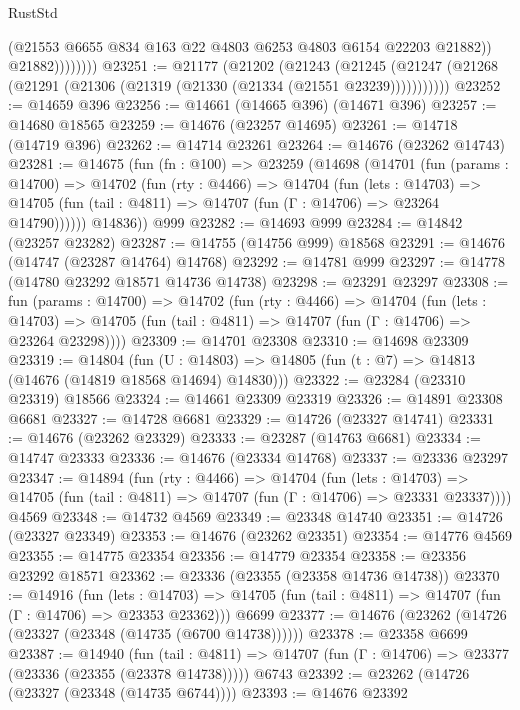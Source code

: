 \begin{lexlean}{RustStd}
\begin{coremodule}
                      (@21553 @6655 @834 @163 @22 @4803 @6253 @4803 @6154 @22203 @21882))
                    @21882))))))))
@23251 := @21177
    (@21202
      (@21243
        (@21245 (@21247 (@21268 (@21291 (@21306 (@21319 (@21330 (@21334 (@21551 @23239)))))))))))
@23252 := @14659 @396
@23256 := @14661 (@14665 @396) (@14671 @396)
@23257 := @14680 @18565
@23259 := @14676 (@23257 @14695)
@23261 := @14718 (@14719 @396)
@23262 := @14714 @23261
@23264 := @14676 (@23262 @14743)
@23281 := @14675
    (fun (fn : @100) =>
    @23259
      (@14698
        (@14701
          (fun (params : @14700) =>
          @14702
            (fun (rty : @4466) =>
            @14704
              (fun (lets : @14703) =>
              @14705 (fun (tail : @4811) => @14707 (fun (Γ : @14706) => @23264 @14790))))))
        @14836))
    @999
@23282 := @14693 @999
@23284 := @14842 (@23257 @23282)
@23287 := @14755 (@14756 @999) @18568
@23291 := @14676 (@14747 (@23287 @14764) @14768)
@23292 := @14781 @999
@23297 := @14778 (@14780 @23292 @18571 @14736 @14738)
@23298 := @23291 @23297
@23308 := fun (params : @14700) =>
  @14702
    (fun (rty : @4466) =>
    @14704
      (fun (lets : @14703) =>
      @14705 (fun (tail : @4811) => @14707 (fun (Γ : @14706) => @23264 @23298))))
@23309 := @14701 @23308
@23310 := @14698 @23309
@23319 := @14804
    (fun (U : @14803) => @14805 (fun (t : @7) => @14813 (@14676 (@14819 @18568 @14694) @14830)))
@23322 := @23284 (@23310 @23319) @18566
@23324 := @14661 @23309 @23319
@23326 := @14891 @23308 @6681
@23327 := @14728 @6681
@23329 := @14726 (@23327 @14741)
@23331 := @14676 (@23262 @23329)
@23333 := @23287 (@14763 @6681)
@23334 := @14747 @23333
@23336 := @14676 (@23334 @14768)
@23337 := @23336 @23297
@23347 := @14894
    (fun (rty : @4466) =>
    @14704
      (fun (lets : @14703) =>
      @14705 (fun (tail : @4811) => @14707 (fun (Γ : @14706) => @23331 @23337))))
    @4569
@23348 := @14732 @4569
@23349 := @23348 @14740
@23351 := @14726 (@23327 @23349)
@23353 := @14676 (@23262 @23351)
@23354 := @14776 @4569
@23355 := @14775 @23354
@23356 := @14779 @23354
@23358 := @23356 @23292 @18571
@23362 := @23336 (@23355 (@23358 @14736 @14738))
@23370 := @14916
    (fun (lets : @14703) =>
    @14705 (fun (tail : @4811) => @14707 (fun (Γ : @14706) => @23353 @23362)))
    @6699
@23377 := @14676 (@23262 (@14726 (@23327 (@23348 (@14735 (@6700 @14738))))))
@23378 := @23358 @6699
@23387 := @14940
    (fun (tail : @4811) => @14707 (fun (Γ : @14706) => @23377 (@23336 (@23355 (@23378 @14738)))))
    @6743
@23392 := @23262 (@14726 (@23327 (@23348 (@14735 @6744))))
@23393 := @14676 @23392

\end{coremodule}
\end{lexlean}
